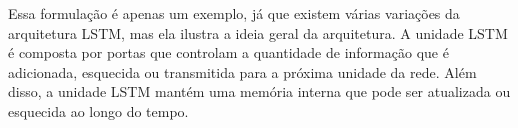 Essa formulação é apenas um exemplo, já que existem várias variações da arquitetura LSTM, mas ela ilustra a ideia geral da arquitetura. A unidade LSTM é composta por portas que controlam a quantidade de informação que é adicionada, esquecida ou transmitida para a próxima unidade da rede. Além disso, a unidade LSTM mantém uma memória interna que pode ser atualizada ou esquecida ao longo do tempo.